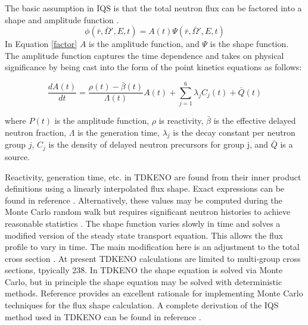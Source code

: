 \documentclass[11pt]{article}
\begin{document}
The basic assumption in IQS is that the total neutron flux can be factored into a shape and amplitude function \cite{Gehin}.  
\begin{equation}
\label{factor}
    \phi(\bar{r},\bar{\Omega}',E,t) = A(t)\Psi(\bar{r},\bar{\Omega}',E,t)
\end{equation}
In Equation \ref{factor} $A$ is the amplitude function, and $\Psi$ is the shape function.
The amplitude function captures the time dependence and takes on physical significance by being cast into the form of the point kinetics equations as follows:

\begin{equation}
    \label{eq:pt_kin}
    \frac{dA(t)}{dt} = \frac{\rho(t)-\bar{\beta}(t)}{\Lambda(t)} A(t) + \sum_{j=1}^{6} \lambda_jC_j(t) + \bar{Q}(t)
\end{equation}

where $P(t)$ is the amplitude function, $\rho$ is reactivity, $\bar{\beta}$ is the effective delayed neutron fraction, $\Lambda$ is the generation time, $\lambda_j$ is the decay constant per neutron group $j$, $C_j$ is the density of delayed neutron precursors for group j, and $\bar{Q}$ is a source.

 Reactivity, generation time, etc. in TDKENO are found from their inner product definitions using a linearly interpolated flux shape. Exact expressions can be found in reference \cite{Bentley}.  Alternatively, these values may be computed during the Monte Carlo random walk but requires significant neutron histories to achieve reasonable statistics \cite{Waddell}.  The shape function varies slowly in time and solves a modified version of the steady state transport equation.  This allows the flux profile to vary in time.  The main modification here is an adjustment to the total cross section \cite{goluoglu2001time, Gehin}.  At present TDKENO calculations are limited to multi-group cross sections, tpyically 238.  In TDKENO the shape equation is solved via Monte Carlo, but in principle the shape equation may be solved with deterministic methods.  Reference \cite{Shayesteh} provides an excellent rationale for implementing Monte Carlo techniques for the flux shape calculation.  A complete derivation of the IQS method used in TDKENO can be found in reference \cite{Bentley}. 
 
\end{document}
